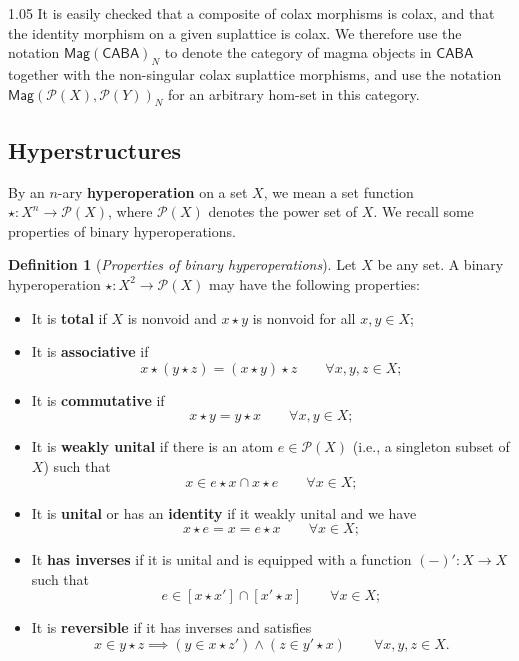 \documentclass[reqno]{amsart}
\newcommand{\pow}{\mathcal{P}}
\newcommand{\cat}{\mathsf}
\numberwithin{equation}{section}
\theoremstyle{plain}
\theoremstyle{definition}
\newtheorem{definition}[equation]{Definition}
\begin{document}
\begin{spacing}{1.05}
It is easily checked that a composite of colax morphisms is colax, and that the identity morphism on a given suplattice is colax. We therefore use the notation $\cat{Mag}(\cat{CABA})_N$ to denote the category of magma objects in $\cat{CABA}$ together with the non-singular colax suplattice morphisms, and use the notation ${\cat{Mag}}(\pow(X),\pow(Y))_N$ for an arbitrary hom-set in this category.

\subsection{Hyperstructures} By an $n$-ary \textbf{hyperoperation} on a set $X$, we mean a set function $\star : X^n \to \pow(X)$, where $\pow(X)$ denotes the power set of $X$. We recall some properties of binary hyperoperations.

\begin{definition}[\textit{Properties of binary hyperoperations}] \label{def:hyperop}  Let $X$ be any set. A binary hyperoperation ${\star : X^2 \to \pow(X)}$ may have the following properties:

\begin{itemize}
    \item[i.] It is \textbf{total} if $X$ is nonvoid and $x \star y$ is nonvoid for all $x,y \in X$;

    \item[ii.] It is \textbf{associative} if $$ x \star (y \star z) = (x \star y) \star z \qquad \forall x,y,z \in X; $$

    \item[iii.] It is \textbf{commutative} if $$ x \star y = y \star x \qquad \forall x,y \in X;$$

    \item[iv.] It is \textbf{weakly unital} if there is an atom $e \in \pow(X)$ (i.e., a singleton subset of $X$) such that $$ x \in e \star x \cap x \star e \qquad \forall x \in X;$$

    \item[v.] It is \textbf{unital} or has an \textbf{identity} if it weakly unital and we have $$x \star e = x = e \star x \qquad \forall x \in X;$$ 

    \item[vi.] It \textbf{has inverses} if it is unital and is equipped with a function $(-)' : X \to X$ such that $$ e \in [x \star x'] \cap [x' \star x] \qquad \forall x \in X;$$

    \item[vii.] It is \textbf{reversible} if it has inverses and satisfies $$ x \in y \star z \implies (y \in x \star z') \land (z \in y' \star x) \qquad \forall x,y,z \in X.$$
\end{itemize}
\end{definition} 


\end{spacing}
\end{document}
